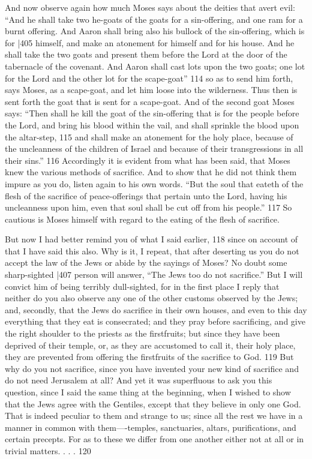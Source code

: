 And now observe again how much Moses says about the deities that avert evil: ``And he shall take two he-goats of the goats for a sin-offering, and one ram for a burnt offering. And Aaron shall bring also his bullock of the sin-offering, which is for
|405 himself, and make an atonement for himself and for his house. And he shall take the two goats and present them before the Lord at the door of the tabernacle of the covenant. And Aaron shall cast lots upon the two goats; one lot for the Lord and the other lot for the scape-goat''
114 \emph{}so as to send him forth, says Moses, as a scape-goat, and let him loose into the wilderness. Thus then is sent forth the goat that is sent for a scape-goat. And of the second goat Moses says: ``Then shall he kill the goat of the sin-offering that is for the people before the Lord, and bring his blood within the vail, and shall sprinkle the blood upon the altar-step, 115 and shall make an atonement for the holy place, because of the uncleanness of the children of Israel and because of their transgressions in all their sins.''
116 Accordingly it is evident from what has been said, that Moses knew the various methods of sacrifice. And to show that he did not think them impure as you do, listen again to his own words. ``But the soul that eateth of the flesh of the sacrifice of peace-offerings that pertain unto the Lord, having his uncleanness upon him, even that soul shall be cut off from his people.''
117 So cautious is Moses himself with regard to the eating of the flesh of sacrifice.

But now I had better remind you of what I said earlier, 118 since on account of that I have said this also. Why is it, I repeat, that after deserting us you do not accept the law of the Jews or abide by the sayings of Moses? No doubt some sharp-sighted
|407 person will answer, ``The Jews too do not sacrifice.'' But I will convict him of being terribly dull-sighted, for in the first place I reply that neither do you also observe any one of the other customs observed by the Jews; and, secondly, that the Jews do sacrifice in their own houses, and even to this day everything that they eat is consecrated; and they pray before sacrificing, and give the right shoulder to the priests as the firstfruits; but since they have been deprived of their temple, or, as they are accustomed to call it, their holy place, they are prevented from offering the firstfruits of the sacrifice to God. 119 But why do you not sacrifice, since you have invented your new kind of sacrifice and do not need Jerusalem at all? And yet it was superfluous to ask you this question, since I said the same thing at the beginning, when I wished to show that the Jews agree with the Gentiles, except that they believe in only one God. That is indeed peculiar to them and strange to us; since all the rest we have in a manner in common with them----temples, sanctuaries, altars, purifications, and certain precepts. For as to these we differ from one another either not at all or in trivial matters. . . . 120

